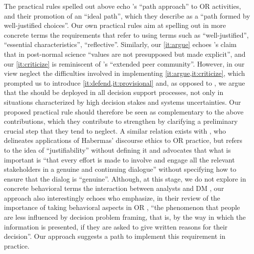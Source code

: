 \documentclass[preprint, french, english, 11pt, authoryear]{elsarticle}%
\newcommand{\possessivecite}[1]{\citeauthor{#1}’s \citeyearpar{#1}}
\begin{document}
The practical rules spelled out above echo \possessivecite{lahtinen_why_2017} ``path approach'' to OR%
 activities, and their promotion of an ``ideal path'', which they describe as a ``path formed by well-justified choices''.
Our own practical rules aim at spelling out in more concrete terms the requirements that \citet{lahtinen_why_2017} refer to using terms such as ``well-justified'', ``essential characteristics'', ``reflective''.
Similarly, our \cref{it:argue} echoes \possessivecite{funtowicz_science_1993} claim that in post-normal science ``values are not presupposed but made explicit'', and our \cref{it:criticize} is reminiscent of \citeauthor{funtowicz_science_1993}’s ``extended peer community''.
However, in our view \citeauthor{funtowicz_science_1993} neglect the difficulties involved in implementing \cref{it:argue,it:criticize}, which prompted us to introduce \cref{it:defend,it:provisional} and, as opposed to \citeauthor{funtowicz_science_1993}, we argue that the  should be deployed in all decision support processes, 
not only in situations characterized by high decision stakes and systems uncertainties.
Our proposed practical rule should therefore be seen as complementary to the above contributions, which they contribute to strengthen by clarifying a preliminary crucial step that they tend to neglect.
A similar relation exists with \citet{mingers_ethics_2011}, who delineates applications of Habermas' discourse ethics to OR%
 practice, but refers to the idea of ``justifiability'' without defining it and 
advocates that what is important is ``that every effort is made to involve and engage all the relevant stakeholders in a genuine and continuing dialogue'' without specifying how to ensure that the dialog is ``genuine''.
Although, at this stage, we do not explore in concrete behavioral terms the interaction between analysts and DM%
, 
our approach also interestingly echoes \citet{hamalainen_importance_2013} who emphasize, in their review of the importance of taking behavioral aspects in OR%
, 
``the phenomenon that people are less influenced by decision problem framing, that is, by the way in which the information is presented, if they are asked to give written reasons for their decision''.
Our approach suggests a path to implement this requirement in practice.
\end{document}
